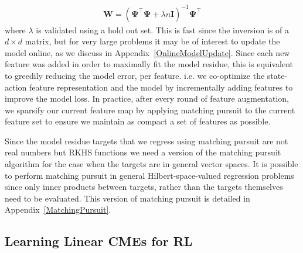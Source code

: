 \documentclass[letterpaper]{article}
\newcommand{\bW}{{\bm W}}
\newcommand{\bI}{{\bm I}}
\newcommand{\bPsi}{{\bm \Psi}}
\begin{document}
\begin{align}
\bW = (\bPsi^\top \bPsi + \lambda n\bI)^{-1}\bPsi^\top \label{ModelUpdateFormula}
\end{align}
where $\lambda$ is validated using a hold out set. This is fast since the inversion is of a $d\times d$ matrix, but for very large problems it may be of interest to update the model online, as we discuss in Appendix~\ref{OnlineModelUpdate}. Since each new feature was added in order to maximally fit the model residue, this is equivalent to greedily reducing the model error, per feature. i.e. we co-optimize the state-action feature representation and the model by incrementally adding features to improve the model loss. In practice, after every round of feature augmentation, we sparsify our current feature map by applying matching pursuit to the current feature set to ensure we maintain as compact a set of features as possible.

Since the model residue targets that we regress using matching pursuit are not real numbers but RKHS functions we need a version of the matching pursuit algorithm for the case when the targets are in general vector spaces. It is possible to perform matching pursuit in general Hilbert-space-valued regression problems since only inner products between targets, rather than the targets themselves need to be evaluated. This version of matching pursuit is detailed in Appendix~\ref{MatchingPursuit}. 






\subsection{Learning Linear CMEs for RL} \label{LinearCME}
\end{document}
